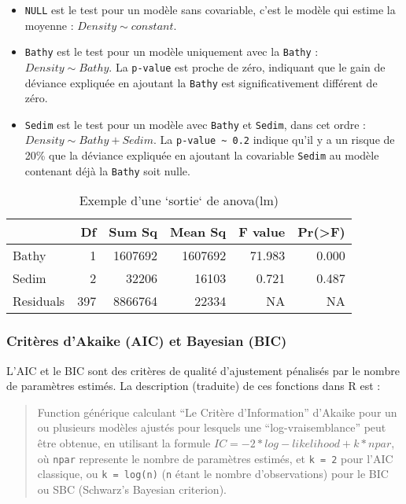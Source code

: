 \documentclass[french,a4paper]{article}
\providecommand{\tightlist}{%
  \setlength{\itemsep}{0pt}\setlength{\parskip}{0pt}}
\begin{document}
\begin{itemize}
\tightlist
\item
  \texttt{NULL} est le test pour un modèle sans covariable, c'est le
  modèle qui estime la moyenne : \(Density \sim constant\).
\item
  \texttt{Bathy} est le test pour un modèle uniquement avec la
  \texttt{Bathy} : \(Density \sim Bathy\). La \texttt{p-value} est
  proche de zéro, indiquant que le gain de déviance expliquée en
  ajoutant la \texttt{Bathy} est significativement différent de zéro.
\item
  \texttt{Sedim} est le test pour un modèle avec \texttt{Bathy} et
  \texttt{Sedim}, dans cet ordre : \(Density \sim Bathy + Sedim\). La
  \texttt{p-value\ \textasciitilde{}\ 0.2} indique qu'il y a un risque
  de 20\% que la déviance expliquée en ajoutant la covariable
  \texttt{Sedim} au modèle contenant déjà la \texttt{Bathy} soit nulle.
\end{itemize}

\begin{table}

\caption{\label{tab:RTableAnova}Exemple d'une `sortie` de anova(lm)}
\centering
\begin{tabular}[t]{l|r|r|r|r|r}
\hline
  & Df & Sum Sq & Mean Sq & F value & Pr(>F)\\
\hline
Bathy & 1 & 1607692 & 1607692 & 71.983 & 0.000\\
\hline
Sedim & 2 & 32206 & 16103 & 0.721 & 0.487\\
\hline
Residuals & 397 & 8866764 & 22334 & NA & NA\\
\hline
\end{tabular}
\end{table}

\subsubsection{Critères d'Akaike (AIC) et Bayesian
(BIC)}\label{criteres-dakaike-aic-et-bayesian-bic}

L'AIC et le BIC sont des critères de qualité d'ajustement pénalisés par
le nombre de paramètres estimés. La description (traduite) de ces
fonctions dans R est :

\begin{quote}
Function générique calculant ``Le Critère d'Information'' d'Akaike pour
un ou plusieurs modèles ajustés pour lesquels une ``log-vraisemblance''
peut être obtenue, en utilisant la formule
\(IC = -2*log-likelihood + k*npar\), où \texttt{npar} represente le
nombre de paramètres estimés, et \texttt{k\ =\ 2} pour l'AIC classique,
ou \texttt{k\ =\ log(n)} (\texttt{n} étant le nombre d'observations)
pour le BIC ou SBC (Schwarz's Bayesian criterion).
\end{quote}
\end{document}

